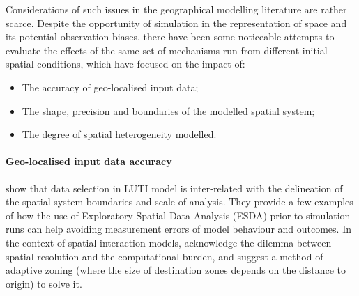 \documentclass[preprint,5p,times,twocolumn,authoryear]{elsarticle}
\begin{document}
Considerations of such issues in the geographical modelling literature are rather scarce. Despite the opportunity of simulation in the representation of space and its potential observation biases, there have been some noticeable attempts to evaluate the effects of the same set of mechanisms run from different initial spatial conditions, which have focused on the impact of:
\begin{itemize}
\item The accuracy of geo-localised input data;
\item The shape, precision and boundaries of the modelled spatial system;
\item The degree of spatial heterogeneity modelled.
\end{itemize}

\paragraph{Geo-localised input data accuracy} \citet{Thomasetal2017} show that data selection in LUTI model is inter-related with the delineation of the spatial system boundaries and scale of analysis. They provide a few examples of how the use of Exploratory Spatial Data Analysis (ESDA) prior to simulation runs can help avoiding measurement errors of model behaviour and outcomes. In the context of spatial interaction models, \citet{hagen2012new} acknowledge the dilemma between spatial resolution and the computational burden, and suggest a method of adaptive zoning (where the size of destination zones depends on the distance to origin) to solve it.
\end{document}
